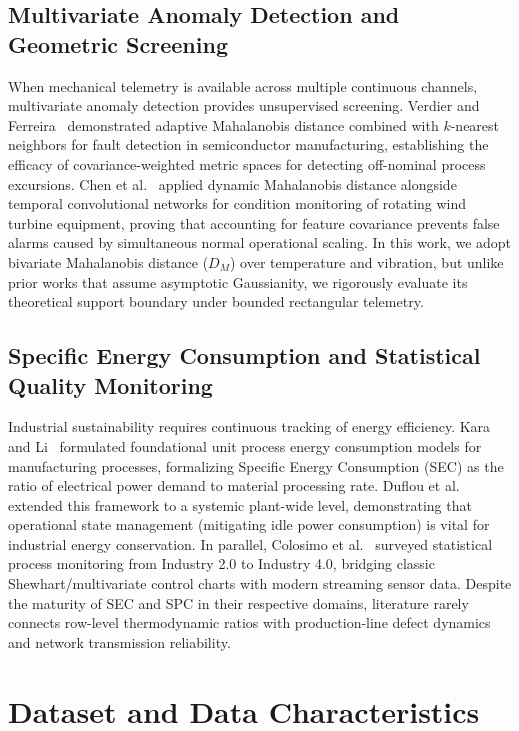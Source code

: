 \documentclass[journal]{IEEEtran}
\begin{document}
\subsection{Multivariate Anomaly Detection and Geometric Screening}
When mechanical telemetry is available across multiple continuous channels, multivariate anomaly detection provides unsupervised screening. Verdier and Ferreira~\cite{Verdier2011} demonstrated adaptive Mahalanobis distance combined with $k$-nearest neighbors for fault detection in semiconductor manufacturing, establishing the efficacy of covariance-weighted metric spaces for detecting off-nominal process excursions. Chen et al.~\cite{Chen2023} applied dynamic Mahalanobis distance alongside temporal convolutional networks for condition monitoring of rotating wind turbine equipment, proving that accounting for feature covariance prevents false alarms caused by simultaneous normal operational scaling. In this work, we adopt bivariate Mahalanobis distance ($D_M$) over temperature and vibration, but unlike prior works that assume asymptotic Gaussianity, we rigorously evaluate its theoretical support boundary under bounded rectangular telemetry.

\subsection{Specific Energy Consumption and Statistical Quality Monitoring}
Industrial sustainability requires continuous tracking of energy efficiency. Kara and Li~\cite{Kara2011} formulated foundational unit process energy consumption models for manufacturing processes, formalizing Specific Energy Consumption (SEC) as the ratio of electrical power demand to material processing rate. Duflou et al.~\cite{Duflou2012} extended this framework to a systemic plant-wide level, demonstrating that operational state management (mitigating idle power consumption) is vital for industrial energy conservation. In parallel, Colosimo et al.~\cite{Colosimo2024} surveyed statistical process monitoring from Industry 2.0 to Industry 4.0, bridging classic Shewhart/multivariate control charts with modern streaming sensor data. Despite the maturity of SEC and SPC in their respective domains, literature rarely connects row-level thermodynamic ratios with production-line defect dynamics and network transmission reliability.

\section{Dataset and Data Characteristics}
\label{sec:dataset}
\end{document}
